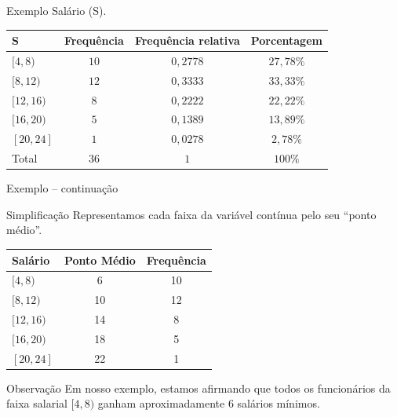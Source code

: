 \documentclass[9pt]{beamer}
\begin{document}
\begin{frame}{Exemplo}
	Salário (S).
	\begin{table}
		\centering
		\begin{tabular}{l|ccc}
			\toprule[0.05cm]
			S & Frequência & Frequência relativa & Porcentagem\\ \midrule[0.05cm]
			$[4,8)$ & $10$ & $0,2778$ & $27,78\%$\\
			$[8,12)$ & $12$ & $0,3333$ & $33,33\%$\\
			$[12,16)$ & $8$ & $0,2222$ & $22,22\%$\\
			$[16,20)$ & $5$ & $0,1389$ & $13,89\%$\\
			$[20,24]$ & $1$ & $0,0278$ & $2,78\%$\\
			\midrule[0.05cm]
			Total & $36$ & $1$ & $100\%$\\ \bottomrule[0.05cm]
		\end{tabular}
	\end{table}
\end{frame}

\begin{frame}{Exemplo -- continuação}
	\begin{block}{Simplificação}
		Representamos cada faixa da variável contínua pelo seu ``ponto médio''.
	\end{block}
		
	\begin{table}
		\centering
		\begin{tabular}{l|cc}
			\toprule[0.05cm]
			Salário & Ponto Médio & Frequência \\ \midrule[0.05cm]
			$[4,8) $ & 6 & 10\\
			$[8,12) $ & 10 & 12\\
			$[12,16) $ & 14 & 8\\
			$[16,20) $ & 18 & 5\\
			$[20,24] $ & 22 & 1\\
			\bottomrule[0.05cm]
		\end{tabular}
	\end{table}
	\begin{block}{Observação}
	  Em nosso exemplo, estamos afirmando que todos os funcionários da faixa salarial $[4,8)$ ganham aproximadamente $6$ salários mínimos.
	\end{block}

\end{frame}
\end{document}
